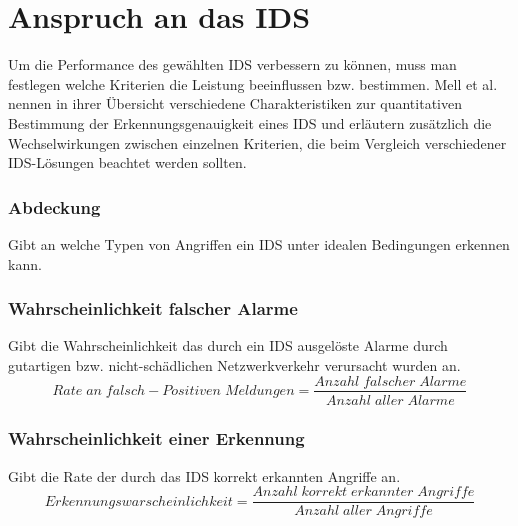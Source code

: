 \section{Anspruch an das IDS}
Um die Performance des gewählten IDS verbessern zu können, muss man festlegen welche Kriterien die Leistung beeinflussen bzw. bestimmen.
Mell et al.\cite{mell2003overview} nennen in ihrer Übersicht verschiedene Charakteristiken zur quantitativen Bestimmung der Erkennungsgenauigkeit eines IDS und erläutern zusätzlich die Wechselwirkungen zwischen einzelnen Kriterien, die beim Vergleich verschiedener IDS-Lösungen beachtet werden sollten.
\subsubsection{Abdeckung}
Gibt an welche Typen von Angriffen ein IDS unter idealen Bedingungen erkennen kann.
\subsubsection{Wahrscheinlichkeit falscher Alarme}
Gibt die Wahrscheinlichkeit das durch ein IDS ausgelöste Alarme durch gutartigen bzw. nicht-schädlichen Netzwerkverkehr verursacht wurden an.\\
\[Rate\;an\;falsch-Positiven\;Meldungen = \frac{Anzahl\;falscher\;Alarme}{Anzahl\;aller\;Alarme}\]
\subsubsection{Wahrscheinlichkeit einer Erkennung}
Gibt die Rate der durch das IDS korrekt erkannten Angriffe an.\\
\[Erkennungswarscheinlichkeit  = \frac{Anzahl\;korrekt\;erkannter\;Angriffe} {Anzahl\;aller\;Angriffe}\]
